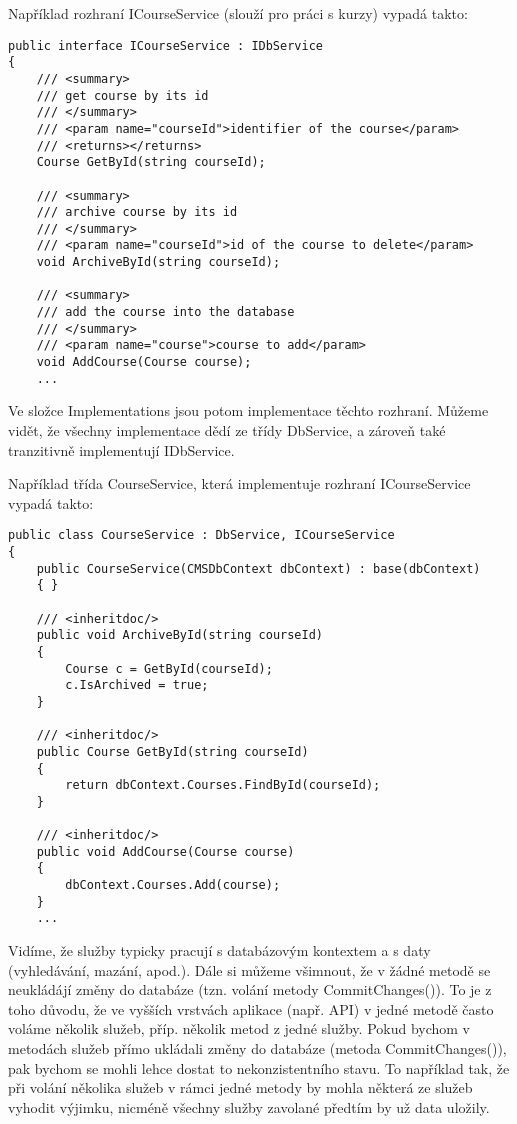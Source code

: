 Například rozhraní ICourseService (slouží pro práci s kurzy) vypadá takto:
\begin{lstlisting}
public interface ICourseService : IDbService
{
	/// <summary>
	/// get course by its id
	/// </summary>
	/// <param name="courseId">identifier of the course</param>
	/// <returns></returns>
	Course GetById(string courseId);
	
	/// <summary>
	/// archive course by its id
	/// </summary>
	/// <param name="courseId">id of the course to delete</param>
	void ArchiveById(string courseId);
	
	/// <summary>
	/// add the course into the database
	/// </summary>
	/// <param name="course">course to add</param>
	void AddCourse(Course course);
	...
\end{lstlisting}

Ve složce Implementations jsou potom implementace těchto rozhraní. Můžeme vidět, že všechny implementace dědí ze třídy DbService, a zároveň také tranzitivně implementují IDbService.

Například třída CourseService, která implementuje rozhraní ICourseService vypadá takto:

\begin{lstlisting}
public class CourseService : DbService, ICourseService
{
	public CourseService(CMSDbContext dbContext) : base(dbContext)
	{ }
	
	/// <inheritdoc/>
	public void ArchiveById(string courseId)
	{
		Course c = GetById(courseId);
		c.IsArchived = true;
	}
	
	/// <inheritdoc/>
	public Course GetById(string courseId)
	{
		return dbContext.Courses.FindById(courseId);
	}
	
	/// <inheritdoc/>
	public void AddCourse(Course course)
	{
		dbContext.Courses.Add(course);
	}
	...
\end{lstlisting}

Vidíme, že služby typicky pracují s databázovým kontextem a s daty (vyhledávání, mazání, apod.).
Dále si můžeme všimnout, že v žádné metodě se neukládájí změny do databáze (tzn. volání metody CommitChanges()). To je z toho důvodu, že ve vyšších vrstvách aplikace (např. API) v jedné metodě často voláme několik služeb, příp. několik metod z jedné služby. 
Pokud bychom v metodách služeb přímo ukládali změny do databáze (metoda CommitChanges()), pak bychom se mohli lehce dostat to nekonzistentního stavu. To například tak, že při volání několika služeb v rámci jedné metody by 
mohla některá ze služeb vyhodit výjimku, nicméně všechny služby zavolané předtím by už data uložily.

